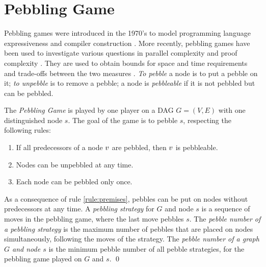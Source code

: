 \documentclass{llncs}
\begin{document}
\section{Pebbling Game}
\label{sec:pebbling-game}

Pebbling games were introduced in the 1970's to model programming language expressiveness \cite{paterson1970comparative,Walker1973404} and compiler construction \cite{sethi1975complete}. More recently, pebbling games have been used to investigate various questions in parallel complexity \cite{chan2013pebble} and proof complexity \cite{ben2008short,Esteban200184,nordstrom2009narrow}. They are used to obtain bounds for space and time requirements and trade-offs between the two measures \cite{van1979move}. \textit{To pebble} a node is to put a pebble on it; \textit{to unpebble} is to remove a pebble; a node is \textit{pebbleable} if it is not pebbled but can be pebbled.

\begin{definition}
\label{def:pebbling-game}
The \emph{Pebbling Game} is played by one player on a DAG $G = (V,E)$ with one distinguished node $s$.
The goal of the game is to pebble $s$, respecting the following rules:
\begin{enumerate}
	\item \label{rule:premises} If all predecessors of a node $v$ are pebbled, then $v$ is pebbleable.
	\item \label{rule:unpebbling} Nodes can be unpebbled at any time.
	\item \label{rule:onlyonce} Each node can be pebbled only once.
\end{enumerate}
As a consequence of rule \ref{rule:premises}, pebbles can be put on nodes without predecessors at any time.
A \emph{pebbling strategy} for $G$ and node $s$ is a sequence of moves in the pebbling game, where the last move pebbles $s$.
The \emph{pebble number of a pebbling strategy} is the maximum number of pebbles that are placed on nodes simultaneously, following the moves of the strategy.
The \emph{pebble number of a graph $G$ and node $s$} is the minimum pebble number of all pebble strategies, for the pebbling game played on $G$ and $s$.
\qed
\end{definition}
\end{document}
